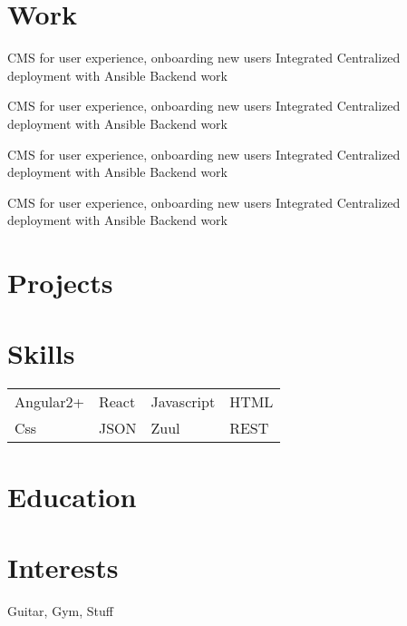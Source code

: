 \documentclass{my_resume}
\begin{document}

\section{Work}

\workitems
{CMS for user experience, onboarding new users}
{Integrated Centralized deployment with Ansible}
{Backend work}

\workitems
{CMS for user experience, onboarding new users}
{Integrated Centralized deployment with Ansible}
{Backend work}

\workitems
{CMS for user experience, onboarding new users}
{Integrated Centralized deployment with Ansible}
{Backend work}

\workitems
{CMS for user experience, onboarding new users}
{Integrated Centralized deployment with Ansible}
{Backend work}

\section{Projects}

\section{Skills}
\begin{tabular}{l l l l}
Angular2+ & React & Javascript & HTML \\
Css & JSON & Zuul & REST
\end{tabular}

\section{Education}

\section{Interests}
Guitar, Gym, Stuff
\end{document}
